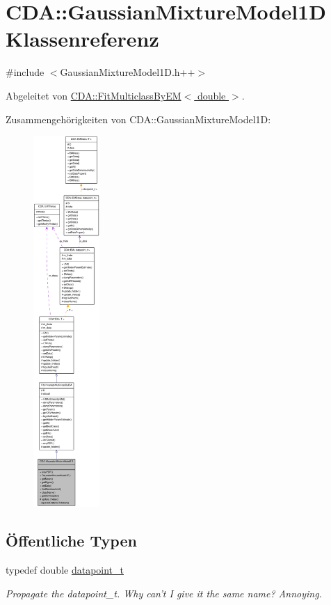 \hypertarget{classCDA_1_1GaussianMixtureModel1D}{
\section{CDA::GaussianMixtureModel1D Klassenreferenz}
\label{classCDA_1_1GaussianMixtureModel1D}
}


{\ttfamily \#include $<$GaussianMixtureModel1D.h++$>$}



Abgeleitet von \hyperlink{classCDA_1_1FitMulticlassByEM}{CDA::FitMulticlassByEM$<$ double $>$}.



Zusammengehörigkeiten von CDA::GaussianMixtureModel1D:\nopagebreak
\begin{figure}[H]
\begin{center}
\leavevmode
\includegraphics[height=400pt]{classCDA_1_1GaussianMixtureModel1D__coll__graph}
\end{center}
\end{figure}
\subsection*{Öffentliche Typen}
\begin{DoxyCompactItemize}
\item 
\hypertarget{classCDA_1_1GaussianMixtureModel1D_a72f70fc9a6a659f61bcaf74597d82aa7}{
typedef double \hyperlink{classCDA_1_1GaussianMixtureModel1D_a72f70fc9a6a659f61bcaf74597d82aa7}{datapoint\_\-t}}
\label{classCDA_1_1GaussianMixtureModel1D_a72f70fc9a6a659f61bcaf74597d82aa7}

\begin{DoxyCompactList}\small\item\em Propagate the datapoint\_\-t. Why can't I give it the same name? Annoying. \item\end{DoxyCompactList}\end{DoxyCompactItemize}
